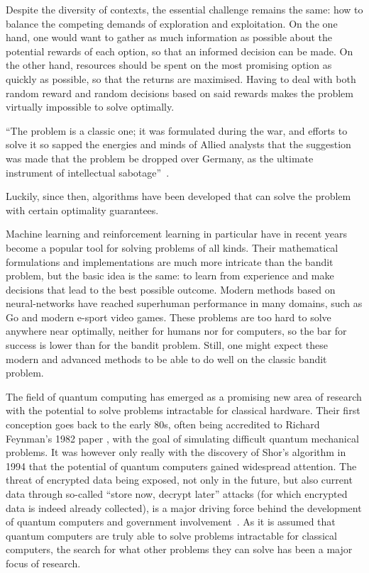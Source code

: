 Despite the diversity of contexts, the essential challenge remains the same: how to balance the competing demands of exploration and exploitation.
On the one hand, one would want to gather as much information as possible about the potential rewards of each option, so that an informed decision can be made.
On the other hand, resources should be spent on the most promising option as quickly as possible, so that the returns are maximised.
Having to deal with both random reward and random decisions based on said rewards makes the problem virtually impossible to solve optimally.
\begin{displayquote}
    \enquote{The problem is a  classic one; it was formulated during the war, and efforts to solve it so sapped the energies and minds of Allied analysts that the suggestion was made that the problem be dropped over Germany, as the ultimate instrument of intellectual sabotage}~\autocite{whittle1979}.
\end{displayquote}
Luckily, since then, algorithms have been developed that can solve the problem with certain optimality guarantees.

Machine learning and reinforcement learning in particular have in recent years become a popular tool for solving problems of all kinds.
Their mathematical formulations and implementations are much more intricate than the bandit problem, but the basic idea is the same: to learn from experience and make decisions that lead to the best possible outcome.
Modern methods based on neural-networks have reached superhuman performance in many domains, such as Go and modern e-sport video games.
These problems are too hard to solve anywhere near optimally, neither for humans nor for computers, so the bar for success is lower than for the bandit problem.
Still, one might expect these modern and advanced methods to be able to do well on the classic bandit problem.

The field of quantum computing has emerged as a promising new area of research with the potential to solve problems intractable for classical hardware.
Their first conception goes back to the early 80s, often being accredited to Richard Feynman's 1982 paper \cite{feynman1982}, with the goal of simulating difficult quantum mechanical problems.
It was however only really with the discovery of Shor's algorithm in 1994 \cite{shor1994} that the potential of quantum computers gained widespread attention.
The threat of encrypted data being exposed, not only in the future, but also current data through so-called \enquote{store now, decrypt later} attacks (for which encrypted data is indeed already collected), is a major driving force behind the development of quantum computers and government involvement~\autocite{alagic2022, cisa2022}.
As it is assumed that quantum computers are truly able to solve problems intractable for classical computers, the search for what other problems they can solve has been a major focus of research.

